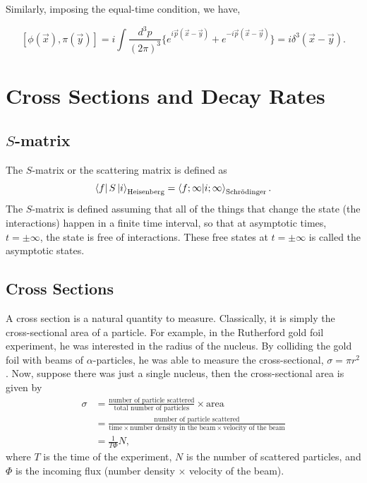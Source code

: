 \documentclass[11pt]{article}
\theoremstyle{definition}
\begin{document}
Similarly, imposing the equal-time condition, we have,
\begin{shaded}
    \begin{equation}
        \left[\phi(\vec{x}), \pi(\vec{y})\right] = i\int \frac{d^3p}{(2\pi)^3} \biggl\{e^{i\vec{p}(\vec{x}-\vec{y})} + e^{-i\vec{p}(\vec{x}-\vec{y})} \biggr\} = i\delta^3(\vec{x}-\vec{y}).
    \end{equation}
    \label{Eq. E-T 2}
\end{shaded}


\section{Cross Sections and Decay Rates}
\subsection{$S$-matrix}
The $S$-matrix or the scattering matrix is defined as
\begin{equation}
    \bra{f}S\ket{i}_{\text{Heisenberg}} = \braket{f;\infty}{i;\infty}_{\text{Schrödinger}}.
\end{equation}
The $S$-matrix is defined assuming that all of the things that change the state (the interactions) happen in a finite time interval, so that at asymptotic times, $t=\pm \infty$, the state is free of interactions. These free states at $t = \pm \infty$ is called the asymptotic states.
\subsection{Cross Sections}
A cross section is a natural quantity to measure. Classically, it is simply the cross-sectional area of a particle. For example, in the Rutherford gold foil experiment, he was interested in the radius of the nucleus. By colliding the gold foil with beams of $\alpha$-particles, he was able to measure the cross-sectional, $\sigma = \pi r^2$. Now, suppose there was just a single nucleus, then the cross-sectional area is given by
\begin{equation}
\begin{aligned}
    \sigma &= \frac{\text{number of particle scattered}}{\text{total number of particles}}\times\text{area}\\
    &=\frac{\text{number of particle scattered}}{\text{time}\times\text{number density in the beam}\times\text{velocity of the beam}}\\
    &=\frac{1}{T\Phi}N,
\end{aligned}
\end{equation}
where $T$ is the time of the experiment, $N$ is the number of scattered particles, and $\Phi$ is the incoming flux (number density $\times$ velocity of the beam).
\end{document}
